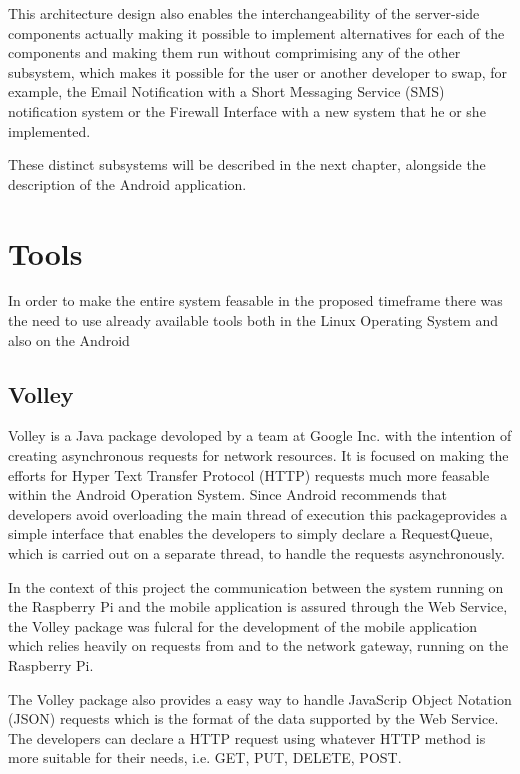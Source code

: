 This architecture design also enables the interchangeability of the server-side
components actually making it possible to implement alternatives for each of the
components and making them run without comprimising any of the other subsystem,
which makes it possible for the user or another developer to swap, for example,
the Email Notification with a Short Messaging Service (SMS) notification system
or the Firewall Interface with a new system that he or she implemented.

These distinct subsystems will be described in the next chapter, alongside the
description of the Android application.


\section{Tools}
\label{chap3:sec:tools}
In order to make the entire system feasable in the proposed timeframe there was
the need to use already available tools both in the Linux Operating System and
also on the Android

\subsection{Volley}
\label{chap3:sec:tools:sub:volley}
Volley is a Java package devoloped by a team at Google Inc. with the intention
of creating asynchronous requests for network resources. It is focused on making
the efforts for Hyper Text Transfer Protocol (HTTP) requests much more feasable
within the Android Operation System. Since Android recommends that developers
avoid overloading the main thread of execution this packageprovides a simple
interface that enables the developers to simply declare a RequestQueue, which is
carried out on a separate thread, to handle the requests asynchronously.

In the context of this project the communication between the system running on
the Raspberry Pi and the mobile application is assured through the Web Service,
the Volley package was fulcral for the development of the mobile application
which relies heavily on requests from and to the network gateway, running on the
Raspberry Pi.

The Volley package also provides a easy way to handle JavaScrip Object Notation
(JSON) requests which is the format of the data supported by the Web Service.
The developers can declare a HTTP request using whatever HTTP method is more
suitable for their needs, i.e. GET, PUT, DELETE, POST.

